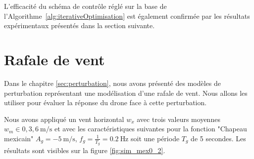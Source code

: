 L'efficacité du schéma de contrôle réglé sur la base de l'Algorithme~\ref{alg:iterativeOptimisation} est également confirmée par les résultats expérimentaux présentés dans la section suivante.

\section{Rafale de vent}

Dans le chapitre \ref{sec:perturbation}, nous avons présenté des modèles de perturbation représentant une modélisation d'une rafale de vent. Nous allons les utiliser pour évaluer la réponse du drone face à cette perturbation. 


Nous avons appliqué un vent horizontal $w_x$ avec trois valeurs moyennes $w_{m} \in {0,3,6}\SI{}{\meter\per\second}$ et avec les caractéristiques suivantes pour la fonction "Chapeau mexicain" $A_g=\SI{-5}{\meter\per\second}$, $f_g = \frac{1}{T_g} = \SI{0.2}{\Hz}$ soit une période $T_g$ de 5 secondes. Les résultats sont visibles sur la figure \ref{fig:sim_mex0_2}.
